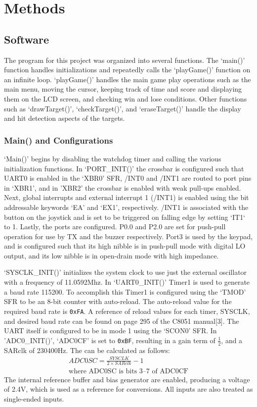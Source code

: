 \documentclass[12pt]{article}
\begin{document}
\section{Methods}
\subsection{Software}
The program for this project was organized into several functions. The `main()' function handles initializations and repeatedly calls the `playGame()' function on an infinite loop. `playGame()' handles the main game play operations such as the main menu, moving the cursor, keeping track of time and score and displaying them on the LCD screen, and checking win and lose conditions. Other functions such as `drawTarget()', `checkTarget()', and `eraseTarget()' handle the display and hit detection aspects of the targets. 

\subsubsection{Main() and Configurations}
`Main()' begins by disabling the watchdog timer and calling the various initialization functions. In `PORT\_INIT()' the crossbar is configured such that UART0 is enabled in the `XBR0' SFR, /INT0 and /INT1 are routed to port pins in `XBR1', and in 'XBR2' the crossbar is enabled with weak pull-ups enabled. Next, global interrupts and external interrupt 1 (/INT1) is enabled using the bit addressable keywords `EA' and `EX1', respectively. /INT1 is associated with the button on the joystick and is set to be triggered on falling edge by setting `IT1` to 1. Lastly, the ports are configured. P0.0 and P2.0 are set for push-pull operation for use by TX and the buzzer respectively. Port3 is used by the keypad, and is configured such that its high nibble is in push-pull mode with digital LO output, and its low nibble is in open-drain mode with high impedance. 

`SYSCLK\_INIT()' initializes the system clock to use just the external oscillator with a frequency of 11.0592\si{Mhz}. In `UART0\_INIT()' Timer1 is used to generate a baud rate 115200. To accomplish this Timer1 is configured using the `TMOD' SFR to be an 8-bit counter with auto-reload. The auto-reload value for the required baud rate is \texttt{0xFA}. A reference of reload values for each timer, SYSCLK, and desired baud rate can be found on page 295 of the C8051 manual[3]. The UART itself is configured to be in mode 1 using the `SCON0' SFR. In 'ADC0\_INIT()', `ADC0CF' is set to \texttt{0xBF}, resulting in a gain term of $\frac{1}{2}$, and a SARclk of 230400\si{Hz}. The can be calculated as follows: 
\begin{gather*}
	ADC0SC=\frac{SYSCLK}{2\times SARclk}-1\\
	\textrm{where ADC0SC is bits 3--7 of ADC0CF}
\end{gather*}
The internal reference buffer and bias generator are enabled, producing a voltage of 2.4\si{V}, which is used as a reference for conversions. All inputs are also treated as single-ended inputs.
\end{document}
